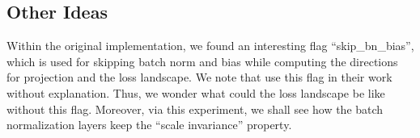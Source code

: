 \subsection{Other Ideas}
\label{sec:others}
Within the original implementation, we found an interesting flag ``skip\_bn\_bias'', which is used for skipping batch norm and bias while computing the directions for projection and the loss landscape. 
We note that \cite{li2018visualizing} use this flag in their work without explanation. 
Thus, we wonder what could the loss landscape be like without this flag. 
Moreover, via this experiment, we shall see how the batch normalization layers keep the ``scale invariance'' property. 